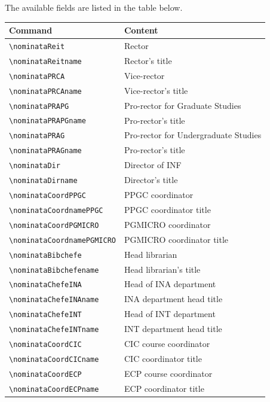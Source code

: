 \documentclass[11pt,a4paper]{article}
\newcommand{\cmd}[1]{\texttt{\textbackslash #1}}
\begin{document}
The available fields are listed in the table below.

\begin{center}
\footnotesize
\begin{tabular}{@{}ll@{}}
  \toprule
  Command & Content \\
  \midrule
  \cmd{nominataReit}          & Rector \\
  \cmd{nominataReitname}      & Rector's title \\
  \cmd{nominataPRCA}          & Vice-rector \\
  \cmd{nominataPRCAname}      & Vice-rector's title \\
  \cmd{nominataPRAPG}         & Pro-rector for Graduate Studies \\
  \cmd{nominataPRAPGname}     & Pro-rector's title \\
  \cmd{nominataPRAG}          & Pro-rector for Undergraduate Studies \\
  \cmd{nominataPRAGname}      & Pro-rector's title \\
  \cmd{nominataDir}           & Director of INF \\
  \cmd{nominataDirname}       & Director's title \\
  \cmd{nominataCoordPPGC}     & PPGC coordinator \\
  \cmd{nominataCoordnamePPGC} & PPGC coordinator title \\
  \cmd{nominataCoordPGMICRO}  & PGMICRO coordinator \\
  \cmd{nominataCoordnamePGMICRO} & PGMICRO coordinator title \\
  \cmd{nominataBibchefe}      & Head librarian \\
  \cmd{nominataBibchefename}  & Head librarian's title \\
  \cmd{nominataChefeINA}      & Head of INA department \\
  \cmd{nominataChefeINAname}  & INA department head title \\
  \cmd{nominataChefeINT}      & Head of INT department \\
  \cmd{nominataChefeINTname}  & INT department head title \\
  \cmd{nominataCoordCIC}      & CIC course coordinator \\
  \cmd{nominataCoordCICname}  & CIC coordinator title \\
  \cmd{nominataCoordECP}      & ECP course coordinator \\
  \cmd{nominataCoordECPname}  & ECP coordinator title \\
  \bottomrule
\end{tabular}
\end{center}
\end{document}

